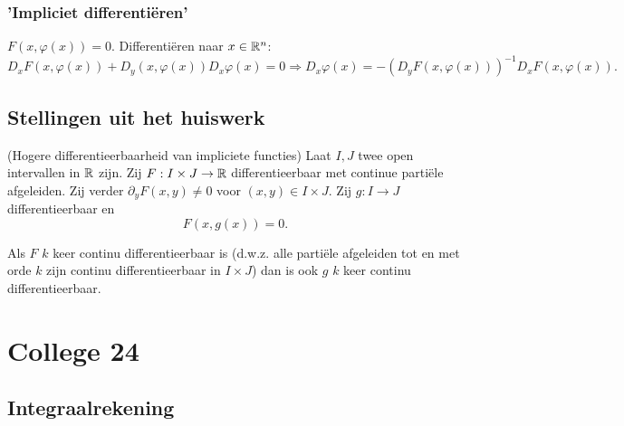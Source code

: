 \documentclass{2wa40summary}
\begin{document}
			\subsubsection{'Impliciet differenti\"eren'}
				$ F(x,\varphi(x))=0 $. Differenti\"eren naar $ x\in \mathbb{R}^n $:
				\[ D_x F(x,\varphi(x)) + D_y (x,\varphi(x))D_x \varphi(x) = 0 \Rightarrow D_x \varphi(x) = -(D_y F(x,\varphi(x)))^{-1} D_x F(x,\varphi(x)). \]
				
		\subsection{Stellingen uit het huiswerk}
			\theorem (Hogere differentieerbaarheid van impliciete functies)
				Laat $I,J$ twee open intervallen in $ \mathbb{R} $ zijn. Zij $F:I \times J \to \mathbb{R}$ differentieerbaar met continue parti\"ele afgeleiden. Zij verder $\partial_y F(x,y) \neq 0$ voor $(x,y) \in I \times J$. Zij $g:I\to J$ differentieerbaar en \[ F(x,g(x)) = 0. \]
				
				Als $F$ $k$ keer continu differentieerbaar is (d.w.z. alle parti\"ele afgeleiden tot en met orde $k$ zijn continu differentieerbaar in $I \times J$) dan is ook $g$ $k$ keer continu differentieerbaar.		
				
		\newpage		
		\section{College 24}
		\subsection{Integraalrekening} 
\end{document}
